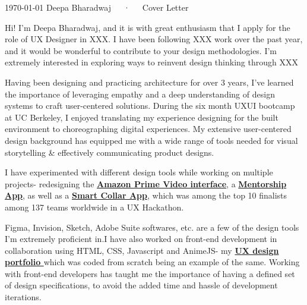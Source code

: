 \documentclass[11pt, a4paper]{awesome-cv}
\begin{document}
\makecvheader[R]

\makecvfooter
  {\today}
  {Deepa Bharadwaj~~~·~~~Cover Letter}
  {}

\makelettertitle

\begin{cvletter}

Hi! I'm Deepa Bharadwaj, and it is with great enthusiasm that I apply for the role of UX Designer in XXX. I have been following XXX work over the past year, and it would be wonderful to contribute to your design methodologies. I'm extremely interested in exploring ways to reinvent design thinking through XXX

Having been designing and practicing architecture for over 3 years, I've learned the importance of leveraging empathy and a deep understanding of design systems to craft user-centered solutions. During the six month UXUI bootcamp at UC Berkeley, I enjoyed translating my experience designing for the built environment to choreographing digital experiences. My extensive user-centered design background has equipped me with a wide range of tools needed for visual storytelling \& effectively communicating product designs.

I have experimented with different design tools while working on multiple projects- redesigning the \textbf{\href{http://bit/ly/primevideocasestudy}{Amazon Prime Video interface}}, a \textbf{\href{http://bit/ly/adultitcasestudy}{Mentorship App}}, as well as a \textbf{\href{http://bit/ly/barkcasestudy}{Smart Collar App}}, which was among the top 10 finalists among 137 teams worldwide in a UX Hackathon. 

Figma, Invision, Sketch, Adobe Suite softwares, etc. are a few of the design tools I'm extremely proficient in.I have also worked on front-end development in collaboration using HTML, CSS, Javascript and AnimeJS- my \textbf{\href{http://deepabharadwaj.com}{UX design portfolio }} which was coded from scratch being an example of the same. Working with front-end developers has taught me the importance of having a defined set of design specifications, to avoid the added time and hassle of development iterations.


\end{cvletter}
\end{document}
